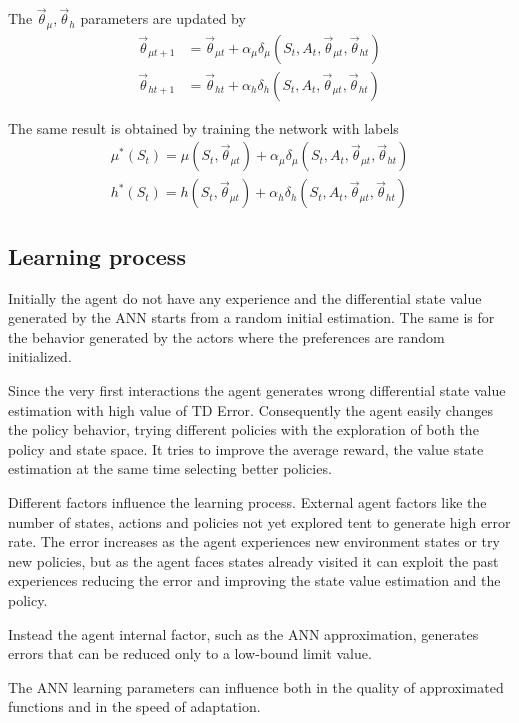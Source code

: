 \documentclass[]{article}
\begin{document}
The $ \vec \theta_\mu, \vec \theta_h $ parameters are updated by
\begin{align*}
	\vec \theta_{\mu t+1}
	&= \vec \theta_{\mu t} + \alpha_\mu \delta_\mu(S_t, A_t, \vec \theta_{\mu t}, \vec \theta_{h t} ) 
	\\
	\vec \theta_{h t+1}
	&= \vec \theta_{h t} + \alpha_h \delta_h(S_t, A_t, \vec \theta_{\mu t}, \vec \theta_{ht} ) 
\end{align*}

The same result is obtained by training the network with labels
\begin{align}
	\mu^*(S_t) = \mu(S_t,\vec \theta_{\mu t}) + 
	\alpha_\mu \delta_\mu(S_t, A_t, \vec \theta_{\mu t}, \vec \theta_{ht})
	\\
	h^*(S_t) = h(S_t,\vec \theta_{\mu t}) + 
\alpha_h \delta_h(S_t, A_t, \vec \theta_{\mu t}, \vec \theta_{ht})
\end{align}

\subsection{Learning process}

Initially the agent do not have any experience and the differential state value generated by the ANN starts from a random initial estimation. The same is for the behavior generated by the actors where the preferences are random initialized.

Since the very first interactions the agent generates wrong differential state value estimation with high value of TD Error. Consequently the agent easily changes the policy behavior, trying different policies with the exploration of both the policy and state space. It tries to improve the average reward, the value state estimation at the same time selecting better policies.

Different factors influence the learning process.
External agent factors like the number of states, actions and policies not yet explored tent to generate high error rate.
The error increases as the agent experiences new environment states or try new policies, but as the agent faces states already visited it can exploit the past experiences reducing the error and improving the state value estimation and the policy.

Instead the agent internal factor, such as the ANN approximation, generates errors that can be reduced only to a low-bound limit value.

The ANN learning parameters can influence both in the quality of approximated functions and in the  speed of adaptation.
\end{document}
